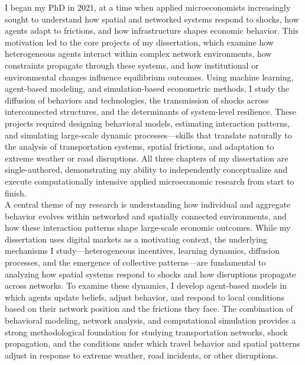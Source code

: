 \documentclass{nfr}
\begin{document}
I began my PhD in 2021, at a time when applied microeconomists increasingly sought to understand how spatial and networked systems respond to shocks, how agents adapt to frictions, and how infrastructure shapes economic behavior. 
This motivation led to the core projects of my dissertation, which examine how heterogeneous agents interact within complex network environments, how constraints propagate through these systems, and how institutional or environmental changes influence equilibrium outcomes. 
Using machine learning, agent-based modeling, and simulation-based econometric methods, I study the diffusion of behaviors and technologies, the transmission of shocks across interconnected structures, and the determinants of system-level resilience. 
These projects required designing behavioral models, estimating interaction patterns, and simulating large-scale dynamic processes—skills that translate naturally to the analysis of transportation systems, spatial frictions, and adaptation to extreme weather or road disruptions. 
All three chapters of my dissertation are single-authored, demonstrating my ability to independently conceptualize and execute computationally intensive applied microeconomic research from start to finish.\\

A central theme of my research is understanding how individual and aggregate behavior evolves within networked and spatially connected environments, and how these interaction patterns shape large-scale economic outcomes. 
While my dissertation uses digital markets as a motivating context, the underlying mechanisms I study—heterogeneous incentives, learning dynamics, diffusion processes, and the emergence of collective patterns—are fundamental to analyzing how spatial systems respond to shocks and how disruptions propagate across networks. 
To examine these dynamics, I develop agent-based models in which agents update beliefs, adjust behavior, and respond to local conditions based on their network position and the frictions they face. 
The combination of behavioral modeling, network analysis, and computational simulation provides a strong methodological foundation for studying transportation networks, shock propagation, and the conditions under which travel behavior and spatial patterns adjust in response to extreme weather, road incidents, or other disruptions.
\\
\end{document}
